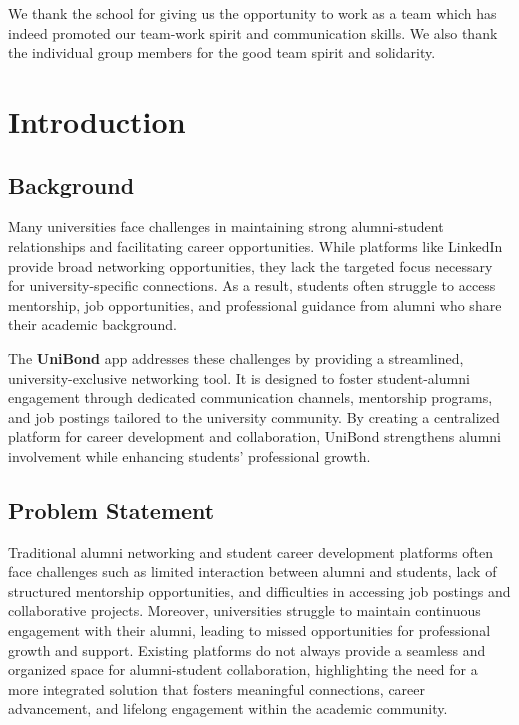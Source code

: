 \documentclass[12pt, a4paper]{report}
\begin{document}
We thank the school for giving us the opportunity to work as a team which has indeed promoted our team-work spirit and communication skills. We also thank the individual group members for the good team spirit and solidarity.

\newpage


\tableofcontents
\listoffigures
\listoftables

\newpage
{} %


\chapter{Introduction}

\section{Background}
Many universities face challenges in maintaining strong alumni-student relationships and facilitating career opportunities. While platforms like LinkedIn provide broad networking opportunities, they lack the targeted focus necessary for university-specific connections. As a result, students often struggle to access mentorship, job opportunities, and professional guidance from alumni who share their academic background.

The \textbf{UniBond} app addresses these challenges by providing a streamlined, university-exclusive networking tool. It is designed to foster student-alumni engagement through dedicated communication channels, mentorship programs, and job postings tailored to the university community. By creating a centralized platform for career development and collaboration, UniBond strengthens alumni involvement while enhancing students' professional growth.

 


\section{Problem Statement}
Traditional alumni networking and student career development platforms often face challenges such as limited interaction between alumni and students, lack of structured mentorship opportunities, and difficulties in accessing job postings and collaborative projects. Moreover, universities struggle to maintain continuous engagement with their alumni, leading to missed opportunities for professional growth and support. Existing platforms do not always provide a seamless and organized space for alumni-student collaboration, highlighting the need for a more integrated solution that fosters meaningful connections, career advancement, and lifelong engagement within the academic community.
\end{document}
